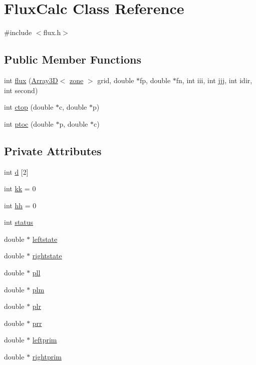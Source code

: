 \hypertarget{classFluxCalc}{}\section{Flux\+Calc Class Reference}
\label{classFluxCalc}


{\ttfamily \#include $<$flux.\+h$>$}

\subsection*{Public Member Functions}
\begin{DoxyCompactItemize}
\item 
int \hyperlink{classFluxCalc_ae1b566f7c632d2dcb123e77d2c89bf5c}{flux} (\hyperlink{classTNT_1_1Array3D}{Array3D}$<$ \hyperlink{structzone}{zone} $>$ grid, double $\ast$fp, double $\ast$fn, int iii, int jjj, int idir, int second)
\item 
int \hyperlink{classFluxCalc_a9c9df42bed3b97586bc268cfee3965c7}{ctop} (double $\ast$c, double $\ast$p)
\item 
int \hyperlink{classFluxCalc_af23d3c12de11a7090fa043479c523c11}{ptoc} (double $\ast$p, double $\ast$c)
\end{DoxyCompactItemize}
\subsection*{Private Attributes}
\begin{DoxyCompactItemize}
\item 
int \hyperlink{classFluxCalc_ac44e4140213abf567f65bc8dcc40f27e}{d} \mbox{[}2\mbox{]}
\item 
int \hyperlink{classFluxCalc_a8503243c4a069efba273a5d711354f22}{kk} = 0
\item 
int \hyperlink{classFluxCalc_ad38bd04c6117848ca7059b3de8dec73e}{hh} = 0
\item 
int \hyperlink{classFluxCalc_a787e2be1064214bc02417c2c073fd6f8}{status}
\item 
double $\ast$ \hyperlink{classFluxCalc_a1d56aedeacd9b9868563f8345045d9df}{leftstate}
\item 
double $\ast$ \hyperlink{classFluxCalc_a5077f5c79d4a3b689f2b18bded131b17}{rightstate}
\item 
double $\ast$ \hyperlink{classFluxCalc_ac7b46a7fb4c9b8ebcb5fbfb6bba8c7e7}{pll}
\item 
double $\ast$ \hyperlink{classFluxCalc_aa6810dc21bde1993624ea0d3fe15b4a3}{plm}
\item 
double $\ast$ \hyperlink{classFluxCalc_a36875143a7a7c560b17570c77624514e}{plr}
\item 
double $\ast$ \hyperlink{classFluxCalc_ab4e7e09c84cf9dfc26961e60209ff4ff}{prr}
\item 
double $\ast$ \hyperlink{classFluxCalc_a3b1c047203afcc878dbfe19a3110a1c9}{leftprim}
\item 
double $\ast$ \hyperlink{classFluxCalc_a0e74db71f1a8b5172816b4cd5505e6b8}{rightprim}
\end{DoxyCompactItemize}


